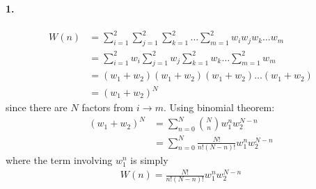 \documentclass[../main.tex]{subfiles}
\begin{document}
\pagestyle{fancy}

\setcounter{section}{1}
\paragraph{1.}
\begin{align*}
    W(n) &= \sum_{i=1}^2 \sum_{j=1}^2 \sum_{k=1}^2 \dots \sum_{m=1}^2 w_i w_j w_k \dots w_m \\
    &= \sum_{i=1}^2 w_i \sum_{j=1}^2 w_j \sum_{k=1}^2 w_k \dots \sum_{m=1}^2 w_m \\
    &= (w_1 + w_2) (w_1 + w_2) (w_1 + w_2) \dots (w_1 + w_2) \\
    &= (w_1 + w_2)^N
\end{align*}
since there are $N$ factors from $i \to m$. Using binomial theorem:
\begin{align*}
    (w_1 + w_2)^N &= \sum_{n=0}^N \binom{N}{n} w_1^n w_2^{N-n} \\
    &= \sum_{n=0}^N \frac{N!}{n!(N-n)!} w_1^n w_2^{N-n}
\end{align*}
where the term involving $w_1^n$ is simply
\begin{align*}
    W(n) = \frac{N!}{n!(N-n)!} w_1^n w_2^{N-n}
\end{align*}

\newpage
\end{document}
